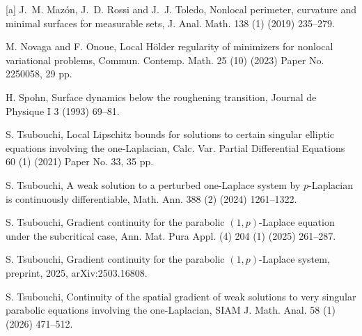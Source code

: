 \documentclass[reqno,10pt]{amsart}
\numberwithin{equation}{section}
\begin{document}
\begin{thebibliography}{[a]}
		 J.~M. Maz\'on, J.~D. Rossi and J.~J. Toledo, Nonlocal perimeter, curvature and minimal surfaces for measurable sets, J. Anal. Math. 138 (1) (2019) 235--279.
		
		 M. Novaga and F. Onoue, Local H\"older regularity of minimizers for nonlocal variational problems, Commun. Contemp. Math. 25 (10) (2023) Paper No. 2250058, 29 pp.
		
		 H. Spohn, Surface dynamics below the roughening transition, Journal de Physique I 3 (1993) 69--81.
		
		 S. Tsubouchi, Local Lipschitz bounds for solutions to certain singular elliptic equations involving the one-Laplacian, Calc. Var. Partial Differential Equations 60 (1) (2021) Paper No. 33, 35 pp.
		
		 S. Tsubouchi, A weak solution to a perturbed one-Laplace system by $p$-Laplacian is continuously differentiable, Math. Ann. 388 (2) (2024) 1261--1322.
		
		 S. Tsubouchi, Gradient continuity for the parabolic $(1,p)$-Laplace equation under the subcritical case, Ann. Mat. Pura Appl. (4) 204 (1) (2025) 261--287.
		
		 S. Tsubouchi, Gradient continuity for the parabolic $(1,p)$-Laplace system, preprint, 2025, arXiv:2503.16808.
		
		 S. Tsubouchi, Continuity of the spatial gradient of weak solutions to very singular parabolic equations involving the one-Laplacian, SIAM J. Math. Anal. 58 (1) (2026) 471--512.
	\end{thebibliography}
\end{document}
